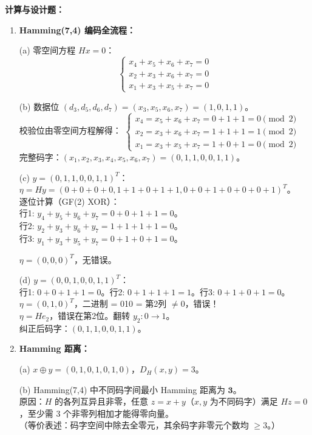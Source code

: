 \documentclass[12pt,a4paper]{ctexart}
\begin{document}
\textbf{计算与设计题：}
\begin{enumerate}[leftmargin=*]
\item[(1)] \textbf{Hamming(7,4) 编码全流程：}

(a) 零空间方程 $Hx=0$：
\[
\begin{cases}
x_4 + x_5 + x_6 + x_7 = 0 \\
x_2 + x_3 + x_6 + x_7 = 0 \\
x_1 + x_3 + x_5 + x_7 = 0
\end{cases}
\]

(b) 数据位 $(d_3,d_5,d_6,d_7) = (x_3,x_5,x_6,x_7) = (1,0,1,1)$。\\
校验位由零空间方程解得：
$\begin{cases}
x_4 = x_5 + x_6 + x_7 = 0+1+1 = 0 \pmod{2} \\
x_2 = x_3 + x_6 + x_7 = 1+1+1 = 1 \pmod{2} \\
x_1 = x_3 + x_5 + x_7 = 1+0+1 = 0 \pmod{2}
\end{cases}$\\
完整码字：$(x_1,x_2,x_3,x_4,x_5,x_6,x_7) = (0,1,1,0,0,1,1)$。

(c) $y = (0,1,1,0,0,1,1)^T$：
$\eta = Hy = (0+0+0+0, 1+1+0+1+1, 0+0+1+0+0+0+1)^T$。\\
逐位计算（GF(2) XOR）：\\
行1: $y_4+y_5+y_6+y_7 = 0+0+1+1 = 0$。\\
行2: $y_2+y_3+y_6+y_7 = 1+1+1+1 = 0$。\\
行3: $y_1+y_3+y_5+y_7 = 0+1+0+1 = 0$。

$\eta = (0,0,0)^T$，无错误。

(d) $y = (0,0,1,0,0,1,1)^T$：\\
行1: $0+0+1+1 = 0$。行2: $0+1+1+1 = 1$。行3: $0+1+0+1 = 0$。\\
$\eta = (0,1,0)^T$，二进制 = 010 = 第2列 $\neq 0$，错误！\\
$\eta = He_2$，错误在第2位。翻转 $y_2: 0\to1$。\\
纠正后码字：$(0,1,1,0,0,1,1)$。

\item[(2)] \textbf{Hamming 距离：}

(a) $x\oplus y = (0,1,0,1,0,1,0)$，$D_H(x,y) = 3$。

(b) Hamming(7,4) 中不同码字间最小 Hamming 距离为 $\mathbf{3}$。\\
原因：$H$ 的各列互异且非零，任意 $z = x+y$（$x,y$ 为不同码字）满足 $Hz=0$，至少需 3 个非零列相加才能得零向量。\\
（等价表述：码字空间中除去全零元，其余码字非零元个数均 $\geq3$。）


\end{enumerate}
\end{document}
